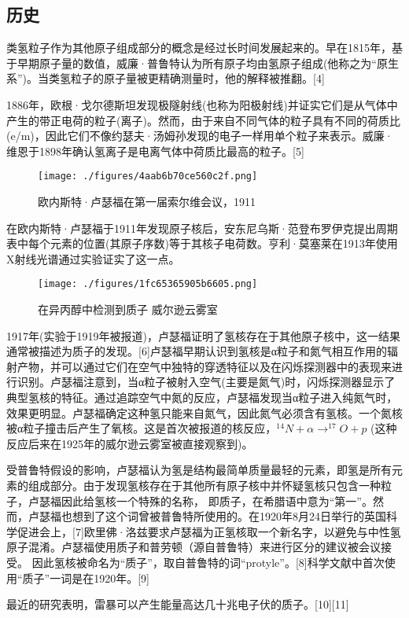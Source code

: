 \subsection{历史}
类氢粒子作为其他原子组成部分的概念是经过长时间发展起来的。早在1815年，基于早期原子量的数值，威廉·普鲁特认为所有原子均由氢原子组成(他称之为“原生系”)。当类氢粒子的原子量被更精确测量时，他的解释被推翻。[4]

1886年，欧根·戈尔德斯坦发现极隧射线(也称为阳极射线)并证实它们是从气体中产生的带正电荷的粒子(离子)。然而，由于来自不同气体的粒子具有不同的荷质比(e/m)，因此它们不像约瑟夫·汤姆孙发现的电子一样用单个粒子来表示。威廉·维恩于1898年确认氢离子是电离气体中荷质比最高的粒子。[5]
\begin{figure}[ht]
\centering
\texttt{[image: ./figures/4aab6b70ce560c2f.png]}
\caption{欧内斯特·卢瑟福在第一届索尔维会议，1911} \label{fig_Proton_4}
\end{figure}
在欧内斯特·卢瑟福于1911年发现原子核后，安东尼乌斯·范登布罗伊克提出周期表中每个元素的位置(其原子序数)等于其核子电荷数。亨利·莫塞莱在1913年使用X射线光谱通过实验证实了这一点。
\begin{figure}[ht]
\centering
\texttt{[image: ./figures/1fc65365905b6605.png]}
\caption{在异丙醇中检测到质子 威尔逊云雾室} \label{fig_Proton_5}
\end{figure}
1917年(实验于1919年被报道)，卢瑟福证明了氢核存在于其他原子核中，这一结果通常被描述为质子的发现。[6]卢瑟福早期认识到氢核是α粒子和氮气相互作用的辐射产物，并可以通过它们在空气中独特的穿透特征以及在闪烁探测器中的表现来进行识别。卢瑟福注意到，当α粒子被射入空气(主要是氮气)时，闪烁探测器显示了典型氢核的特征。通过追踪空气中氮的反应，卢瑟福发现当α粒子进入纯氮气时，效果更明显。卢瑟福确定这种氢只能来自氮气，因此氮气必须含有氢核。一个氮核被α粒子撞击后产生了氧核。这是首次被报道的核反应，$^{14}N + \alpha \to ^{17}O + p$ (这种反应后来在1925年的威尔逊云雾室被直接观察到)。

受普鲁特假设的影响，卢瑟福认为氢是结构最简单质量最轻的元素，即氢是所有元素的组成部分。由于发现氢核存在于其他所有原子核中并怀疑氢核只包含一种粒子，卢瑟福因此给氢核一个特殊的名称， 即质子，在希腊语中意为“第一”。然而，卢瑟福也想到了这个词曾被普鲁特所使用的。在1920年8月24日举行的英国科学促进会上，[7]欧里佛·洛兹要求卢瑟福为正氢核取一个新名字，以避免与中性氢原子混淆。卢瑟福使用质子和普劳顿（源自普鲁特）来进行区分的建议被会议接受。 因此氢核被命名为“质子”，取自普鲁特的词“protyle”。[8]科学文献中首次使用“质子”一词是在1920年。[9]

最近的研究表明，雷暴可以产生能量高达几十兆电子伏的质子。[10][11]

